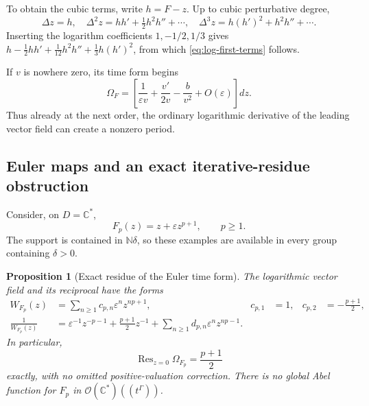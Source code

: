 \documentclass[11pt,a4paper]{article}
\numberwithin{equation}{section}
\newtheorem{proposition}[proposition]{Proposition}
\theoremstyle{definition}
\theoremstyle{remark}
\newcommand{\C}{\mathbb C}
\newcommand{\N}{\mathbb N}
\newcommand{\Oh}{\mathcal O}
\newcommand{\eps}{\varepsilon}
\newcommand{\Res}{\operatorname{Res}}
\begin{document}
To obtain the cubic terms, write $h=F-z$.  Up to cubic perturbative degree,
\[
 \Delta z=h,\quad
 \Delta^2z=hh'+\tfrac12h^2h''+\cdots,\quad
 \Delta^3z=h(h')^2+h^2h''+\cdots.
\]
Inserting the logarithm coefficients $1,-1/2,1/3$ gives
$h-\frac12hh'+\frac1{12}h^2h''+\frac13h(h')^2$, from which
\eqref{eq:log-first-terms} follows.

If $v$ is nowhere zero, its time form begins
\begin{equation}\label{eq:time-first-terms}
 \Omega_F=
 \left[\frac1{\eps v}+\frac{v'}{2v}-\frac{b}{v^2}
                 +O(\eps)\right]dz.
\end{equation}
Thus already at the next order, the ordinary logarithmic derivative of the
leading vector field can create a nonzero period.

\subsection{Euler maps and an exact iterative-residue obstruction}

Consider, on $D=\C^*$,
\begin{equation}\label{eq:euler-map}
 F_p(z)=z+\eps z^{p+1},\qquad p\geq1.
\end{equation}
The support is contained in $\N\delta$, so these examples are available
in every group containing $\delta>0$.

\begin{proposition}[Exact residue of the Euler time form]
\label{prop:euler-residue}
The logarithmic vector field and its reciprocal have the forms
\begin{align}
 W_{F_p}(z)&=\sum_{n\geq1}c_{p,n}\eps^n z^{np+1},
      &c_{p,1}&=1,& c_{p,2}&=-\frac{p+1}{2},\label{eq:euler-grading}\\
 \frac1{W_{F_p}(z)}&=\eps^{-1}z^{-p-1}
       +\frac{p+1}{2}z^{-1}
       +\sum_{n\geq1}d_{p,n}\eps^n z^{np-1}.
       \label{eq:euler-reciprocal}
\end{align}
In particular,
\begin{equation}\label{eq:euler-residue}
 \Res_{z=0}\Omega_{F_p}=\frac{p+1}{2}
\end{equation}
exactly, with no omitted positive-valuation correction.  There is no global
Abel function for $F_p$ in $\Oh(\C^*)((t^\Gamma))$.
\end{proposition}
\end{document}
